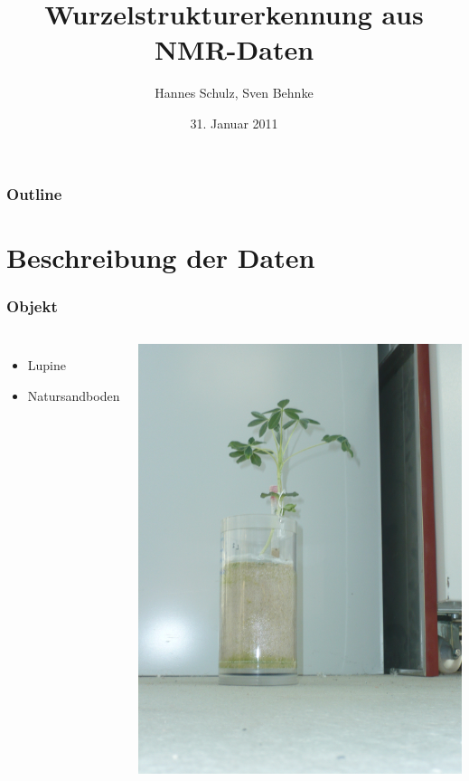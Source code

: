 \documentclass[final,ngerman,ignorenonframetext,compress]{beamer}
\title{Wurzelstrukturerkennung aus NMR-Daten}
\author{Hannes Schulz, Sven Behnke}
\institute[Uni Bonn, Germany]%
{\texttt{[image: Logo\_UBo\_h24\_4c-crop]}}
\date{31. Januar 2011}
\begin{document}
\begin{frame}[plain]
	\titlepage%
\end{frame}


\begin{frame}[plain] %
	\frametitle{Outline}
	\tableofcontents[hidesubsections]
\end{frame}

\section{Beschreibung der Daten}

\begin{frame}
	\frametitle{Objekt}
	\begin{columns}
		\begin{itemize}
			\item Lupine
			\item Natursandboden
		\end{itemize}
		\includegraphics[width=\linewidth]{img/o}
	\end{columns}
\end{frame}
\end{document}
